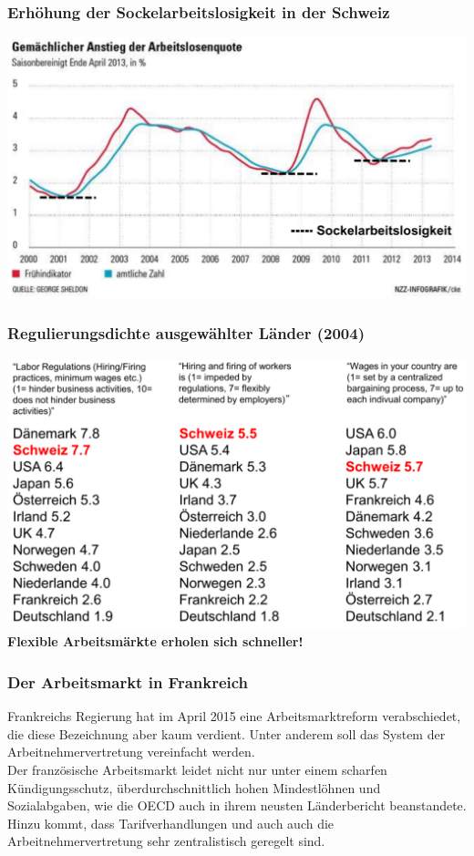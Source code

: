 \begin{multicols}{2}
\subsubsection{Erhöhung der Sockelarbeitslosigkeit in der Schweiz}
\includegraphics[width=\linewidth]{images/sockelarbeitslosigkeit.png}
\vfill\null
\columnbreak
\subsubsection{Regulierungsdichte ausgewählter Länder (2004)}
\includegraphics[width=\linewidth]{images/regulierungsdichte.png}
\textbf{Flexible Arbeitsmärkte erholen sich schneller!}
\end{multicols}

\subsubsection{Der Arbeitsmarkt in Frankreich}
Frankreichs Regierung hat im April 2015 eine Arbeitsmarktreform verabschiedet, die diese Bezeichnung aber kaum verdient. Unter anderem soll das System der Arbeitnehmervertretung vereinfacht werden.\\
Der französische Arbeitsmarkt leidet nicht nur unter einem scharfen Kündigungsschutz, überdurchschnittlich hohen Mindestlöhnen und Sozialabgaben, wie die OECD auch in ihrem neusten Länderbericht beanstandete. Hinzu kommt, dass Tarifverhandlungen und auch auch die Arbeitnehmervertretung sehr zentralistisch geregelt sind.

